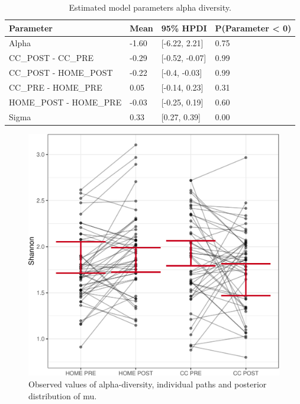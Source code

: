 \documentclass[,man]{apa6}
\begin{document}
\begin{table}[tbp]
\begin{center}
\begin{threeparttable}
\caption{\label{tab:unnamed-chunk-13}Estimated model parameters alpha diversity.}
\begin{tabular}{llll}
\toprule
Parameter & \multicolumn{1}{c}{Mean} & \multicolumn{1}{c}{95\% HPDI} & \multicolumn{1}{c}{P(Parameter < 0)}\\
\midrule
Alpha & -1.60 & [-6.22, 2.21] & 0.75\\
CC\_POST - CC\_PRE & -0.29 & [-0.52, -0.07] & 0.99\\
CC\_POST - HOME\_POST & -0.22 & [-0.4, -0.03] & 0.99\\
CC\_PRE - HOME\_PRE & 0.05 & [-0.14, 0.23] & 0.31\\
HOME\_POST - HOME\_PRE & -0.03 & [-0.25, 0.19] & 0.60\\
Sigma & 0.33 & [0.27, 0.39] & 0.00\\
\bottomrule
\end{tabular}
\end{threeparttable}
\end{center}
\end{table}

\begin{figure}
\centering
\includegraphics{index_files/figure-latex/unnamed-chunk-14-1.pdf}
\caption{\label{fig:unnamed-chunk-14}Observed values of alpha-diversity,
individual paths and posterior distribution of mu.}
\end{figure}
\end{document}
